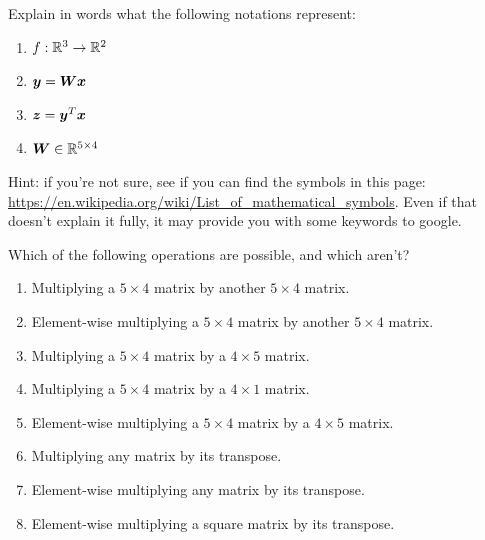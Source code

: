 \documentclass[11pt]{article}
\begin{document}
\begin{Exercise}
\noindent Explain in words what the following notations represent:

\begin{enumerate}
\item $f: {\mathbb R}^3 \to {\mathbb R}^2$ 
\item ${\bm y} = {\bm W} {\bm x}$ 
\item ${\bm z} = {\bm y}^T{\bm x}$ 
\item ${\bm W} \in {\mathbb R}^{5 \times 4}$ 
\end{enumerate}
Hint: if you're not sure, see if you can find the symbols in this page: \url{https://en.wikipedia.org/wiki/List_of_mathematical_symbols}. Even if that doesn't explain it fully, it may provide you with some keywords to google.
\end{Exercise}

\begin{Exercise}
\noindent Which of the following operations are possible, and which aren't?

\begin{enumerate}
\item Multiplying a $5 \times 4$ matrix by another $5 \times 4$ matrix. 
\item Element-wise multiplying a $5 \times 4$ matrix by another $5 \times 4$ matrix. 
\item Multiplying a $5 \times 4$ matrix by a $4 \times 5$ matrix. 
\item Multiplying a $5 \times 4$ matrix by a $4 \times 1$ matrix. 
\item Element-wise multiplying a $5 \times 4$ matrix by a $4 \times 5$ matrix. 
\item Multiplying any matrix by its transpose. 
\item Element-wise multiplying any matrix by its transpose. 
\item Element-wise multiplying a square matrix by its transpose. 
\end{enumerate}
\end{Exercise}
\end{document}
